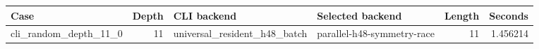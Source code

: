 {\small
\begin{tabular}{lrllrr}
\hline
Case & Depth & CLI backend & Selected backend & Length & Seconds \\
\hline
cli\_random\_depth\_11\_0 & 11 & universal\_resident\_h48\_batch & parallel-h48-symmetry-race & 11 & 1.456214 \\
\hline
\end{tabular}
}
